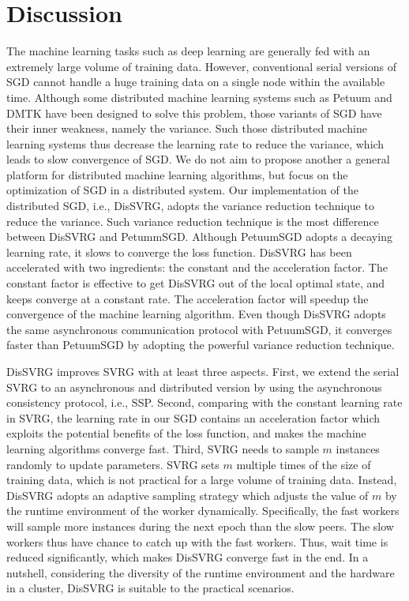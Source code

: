 \documentclass[preprint,review,11pt,a4paper]{elsarticle}
\begin{document}
\section{Discussion}
\label{discussion}
The machine learning tasks such as deep learning are generally fed with an extremely large volume of training data. However, conventional serial versions of SGD  cannot handle a huge training data on a single node within the available time. Although some distributed machine learning systems such as Petuum \cite{Xing:2015ib} and DMTK\cite{Yuan:2015ka} have been designed to solve this problem, those variants of SGD have their inner weakness, namely the variance. Such those distributed machine learning systems thus decrease the learning rate to reduce the variance, which leads to slow convergence of SGD. We do not aim to propose another a general platform for distributed machine learning algorithms, but focus on the optimization of SGD in a distributed system. Our implementation of the distributed SGD, i.e., DisSVRG, adopts the variance reduction technique to reduce the variance. Such variance reduction technique is the most difference between DisSVRG and PetummSGD. Although PetuumSGD  adopts a decaying learning rate, it slows to converge the loss function. DisSVRG has been accelerated with two ingredients: the constant and the acceleration factor. The constant factor is effective to get DisSVRG out of the local optimal state, and keeps converge at a constant rate. The acceleration factor will speedup the convergence of the machine learning algorithm. Even though DisSVRG adopts the same asynchronous communication protocol with PetuumSGD, it converges faster than PetuumSGD by adopting the powerful variance reduction technique.

DisSVRG improves SVRG with at least three aspects. First, we extend the serial SVRG to an asynchronous and distributed version by using the asynchronous consistency protocol, i.e., SSP. Second, comparing with the constant learning rate in SVRG, the learning rate in our SGD contains an acceleration factor which exploits the potential benefits of the loss function, and makes the machine learning algorithms converge fast. Third, SVRG needs to sample $m$ instances randomly to update parameters. SVRG sets $m$ multiple times of the size of training data, which is not practical for a large volume of training data. Instead, DisSVRG adopts an adaptive sampling strategy which adjusts the value of $m$ by the runtime environment of the worker dynamically. Specifically, the fast workers will sample more instances during the next epoch than the slow peers. The slow workers thus have chance to catch up with the fast workers. Thus, wait time is reduced significantly, which makes DisSVRG converge fast in the end. In a nutshell, considering the diversity of the runtime environment and the hardware in a cluster, DisSVRG is suitable to the practical scenarios.
\end{document}
